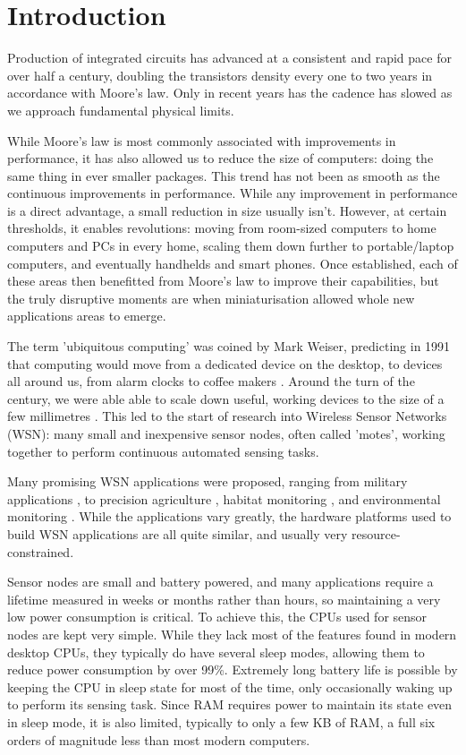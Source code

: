 \chapter{Introduction}

Production of integrated circuits has advanced at a consistent and rapid pace for over half a century, doubling the transistors density every one to two years in accordance with Moore's law. Only in recent years has the cadence has slowed as we approach fundamental physical limits.

While Moore's law is most commonly associated with improvements in performance, it has also allowed us to reduce the size of computers: doing the same thing in ever smaller packages. This trend has not been as smooth as the continuous improvements in performance. While any improvement in performance is a direct advantage, a small reduction in size usually isn't. However, at certain thresholds, it enables revolutions: moving from room-sized computers to home computers and PCs in every home,  scaling them down further to portable/laptop computers, and eventually handhelds and smart phones. Once established, each of these areas then benefitted from Moore's law to improve their capabilities, but the truly disruptive moments are when miniaturisation allowed whole new applications areas to emerge.

The term 'ubiquitous computing' was coined by Mark Weiser, predicting in 1991 that computing would move from a dedicated device on the desktop, to devices all around us, from alarm clocks to coffee makers \cite{Weiser:1991wz}. Around the turn of the century, we were able able to scale down useful, working devices to the size of a few millimetres \cite{Warneke:2001ui}. This led to the start of research into Wireless Sensor Networks (WSN): many small and inexpensive sensor nodes, often called 'motes', working together to perform continuous automated sensing tasks.

Many promising WSN applications were proposed, ranging from military applications \cite{Arora:2004}, to precision agriculture \cite{Langendoen:2006un}, habitat monitoring \cite{Mainwaring:2002wb}, and environmental monitoring \cite{WernerAllen:2006ta, Chang:2010ek}. While the applications vary greatly, the hardware platforms used to build WSN applications are all quite similar, and usually very resource-constrained.

Sensor nodes are small and battery powered, and many applications require a lifetime measured in weeks or months rather than hours, so maintaining a very low power consumption is critical. To achieve this, the CPUs used for sensor nodes are kept very simple. While they lack most of the features found in modern desktop CPUs, they typically do have several sleep modes, allowing them to reduce power consumption by over 99\%. Extremely long battery life is possible by keeping the CPU in sleep state for most of the time, only occasionally waking up to perform its sensing task. Since RAM requires power to maintain its state even in sleep mode, it is also limited, typically to only a few KB of RAM, a full six orders of magnitude less than most modern computers.

